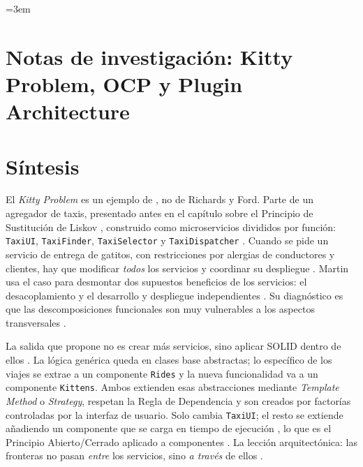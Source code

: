 
\begingroup\emergencystretch=3em 
\section*{Notas de investigación: Kitty Problem, OCP y Plugin Architecture}

\section{Síntesis}

El \emph{Kitty Problem} es un ejemplo de \textcite[242--243]{martin2017}, no de Richards y
Ford. Parte de un agregador de taxis, presentado antes en el capítulo sobre el Principio
de Sustitución de Liskov \parencite[80]{martin2017}, construido como microservicios
divididos por función: \texttt{TaxiUI}, \texttt{TaxiFinder}, \texttt{TaxiSelector} y
\texttt{TaxiDispatcher} \parencite[242]{martin2017}. Cuando se pide un servicio de entrega
de gatitos, con restricciones por alergias de conductores y clientes, hay que modificar
\emph{todos} los servicios y coordinar su despliegue \parencite[243]{martin2017}. Martin
usa el caso para desmontar dos supuestos beneficios de los servicios: el desacoplamiento
y el desarrollo y despliegue independientes \parencite[240--241]{martin2017}. Su
diagnóstico es que las descomposiciones funcionales son muy vulnerables a los aspectos
transversales \parencite[243]{martin2017}.

La salida que propone no es crear más servicios, sino aplicar SOLID dentro de ellos
\parencite[244]{martin2017}. La lógica genérica queda en clases base abstractas; lo
específico de los viajes se extrae a un componente \texttt{Rides} y la nueva funcionalidad
va a un componente \texttt{Kittens}. Ambos extienden esas abstracciones mediante
\emph{Template Method} o \emph{Strategy}, respetan la Regla de Dependencia y son creados
por factorías controladas por la interfaz de usuario. Solo cambia \texttt{TaxiUI}; el
resto se extiende añadiendo un componente que se carga en tiempo de ejecución
\parencite[244]{martin2017}, lo que es el Principio Abierto/Cerrado aplicado a
componentes \parencite[246]{martin2017}. La lección arquitectónica: las fronteras no
pasan \emph{entre} los servicios, sino \emph{a través} de ellos
\parencite[246--247]{martin2017}.

